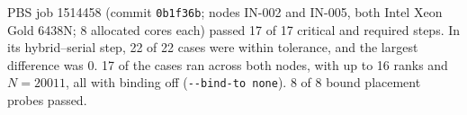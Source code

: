 PBS job 1514458 (commit \texttt{0b1f36b}; nodes IN-002 and IN-005, both Intel Xeon Gold 6438N; 8 allocated cores each) passed 17 of 17 critical and required steps. In its hybrid--serial step, 22 of 22 cases were within tolerance, and the largest difference was 0. 17 of the cases ran across both nodes, with up to 16 ranks and $N=20011$, all with binding off (\texttt{-{}-bind-to none}). 8 of 8 bound placement probes passed.
